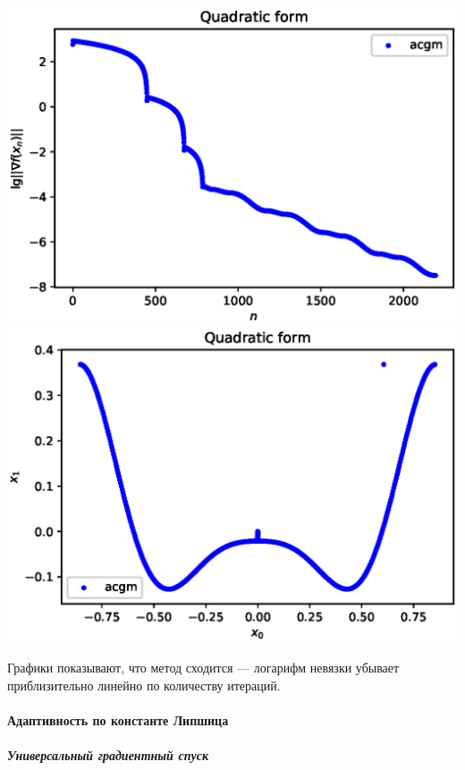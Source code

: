 \documentclass{crm-article}
\begin{document}
\noindent
\includegraphics[scale=0.5]{plots/ill_sqr_des.eps}
\includegraphics[scale=0.5]{plots/xy_sqr_des.eps}

Графики показывают, что метод сходится --- логарифм невязки убывает приблизительно линейно по количеству итераций.

\paragraph{Адаптивность по константе Липшица}
\subparagraph{Универсальный градиентный спуск}
\end{document}
